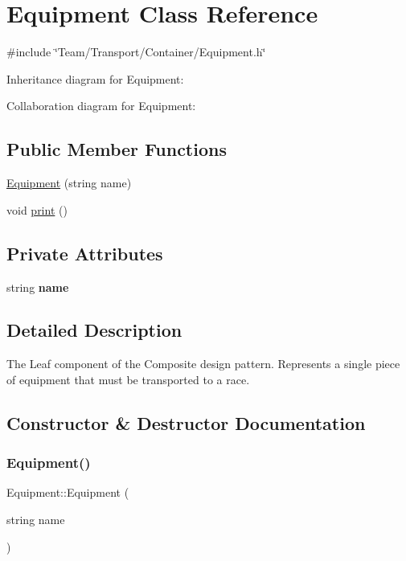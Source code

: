 \hypertarget{classEquipment}{}\section{Equipment Class Reference}
\label{classEquipment}


{\ttfamily \#include \char`\"{}Team/\+Transport/\+Container/\+Equipment.\+h\char`\"{}}



Inheritance diagram for Equipment\+:


Collaboration diagram for Equipment\+:
\subsection*{Public Member Functions}
\begin{DoxyCompactItemize}
\item 
\hyperlink{classEquipment_a40b66c38f62cee0ef51b7062d91946bf}{Equipment} (string name)
\item 
void \hyperlink{classEquipment_a78d184209461b59fe23dabe8f9325dfe}{print} ()
\end{DoxyCompactItemize}
\subsection*{Private Attributes}
\begin{DoxyCompactItemize}
\item 
\mbox{\label{classEquipment_a65c3c95bb543fd763fe6bdf7587c1d33}} 
string {\bfseries name}
\end{DoxyCompactItemize}


\subsection{Detailed Description}
The Leaf component of the Composite design pattern. Represents a single piece of equipment that must be transported to a race. 

\subsection{Constructor \& Destructor Documentation}
\mbox{\label{classEquipment_a40b66c38f62cee0ef51b7062d91946bf}} 
\subsubsection{\texorpdfstring{Equipment()}{Equipment()}}
{\footnotesize\ttfamily Equipment\+::\+Equipment (\begin{DoxyParamCaption}\item[{string}]{name }\end{DoxyParamCaption})}


